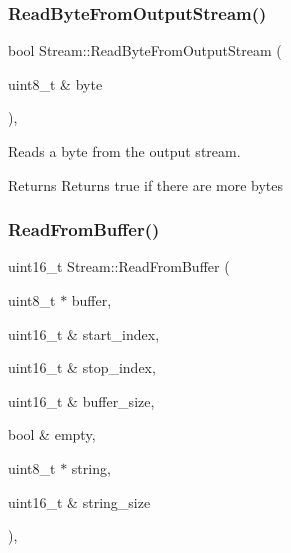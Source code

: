 \subsubsection{\texorpdfstring{Read\+Byte\+From\+Output\+Stream()}{ReadByteFromOutputStream()}}
{\footnotesize\ttfamily bool Stream\+::\+Read\+Byte\+From\+Output\+Stream (\begin{DoxyParamCaption}\item[{uint8\+\_\+t \&}]{byte }\end{DoxyParamCaption})\hspace{0.3cm}{\ttfamily [protected]}, {\ttfamily [virtual]}}

Reads a byte from the output stream. \begin{DoxyReturn}{Returns}
Returns true if there are more bytes 
\end{DoxyReturn}
\hypertarget{class_stream_a752930f620aed4a3a80b243ce66e57ca}{}\label{class_stream_a752930f620aed4a3a80b243ce66e57ca} 
\subsubsection{\texorpdfstring{Read\+From\+Buffer()}{ReadFromBuffer()}}
{\footnotesize\ttfamily uint16\+\_\+t Stream\+::\+Read\+From\+Buffer (\begin{DoxyParamCaption}\item[{uint8\+\_\+t $\ast$}]{buffer,  }\item[{uint16\+\_\+t \&}]{start\+\_\+index,  }\item[{uint16\+\_\+t \&}]{stop\+\_\+index,  }\item[{uint16\+\_\+t \&}]{buffer\+\_\+size,  }\item[{bool \&}]{empty,  }\item[{uint8\+\_\+t $\ast$}]{string,  }\item[{uint16\+\_\+t \&}]{string\+\_\+size }\end{DoxyParamCaption})\hspace{0.3cm}{\ttfamily [protected]}, {\ttfamily [virtual]}}

